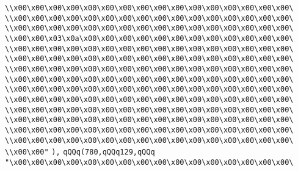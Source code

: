 \verb|\\x00\x00\x00\x00\x00\x00\x00\x00\x00\x00\x00\x00\x00\x00\x00\x00\|\newline
\verb|\\x00\x00\x00\x00\x00\x00\x00\x00\x00\x00\x00\x00\x00\x00\x00\x00\|\newline
\verb|\\x00\x00\x00\x00\x00\x00\x00\x00\x00\x00\x00\x00\x00\x00\x00\x00\|\newline
\verb|\\x00\x00\x03\x0a\x00\x00\x00\x00\x00\x00\x00\x00\x00\x00\x00\x00\|\newline
\verb|\\x00\x00\x00\x00\x00\x00\x00\x00\x00\x00\x00\x00\x00\x00\x00\x00\|\newline
\verb|\\x00\x00\x00\x00\x00\x00\x00\x00\x00\x00\x00\x00\x00\x00\x00\x00\|\newline
\verb|\\x00\x00\x00\x00\x00\x00\x00\x00\x00\x00\x00\x00\x00\x00\x00\x00\|\newline
\verb|\\x00\x00\x00\x00\x00\x00\x00\x00\x00\x00\x00\x00\x00\x00\x00\x00\|\newline
\verb|\\x00\x00\x00\x00\x00\x00\x00\x00\x00\x00\x00\x00\x00\x00\x00\x00\|\newline
\verb|\\x00\x00\x00\x00\x00\x00\x00\x00\x00\x00\x00\x00\x00\x00\x00\x00\|\newline
\verb|\\x00\x00\x00\x00\x00\x00\x00\x00\x00\x00\x00\x00\x00\x00\x00\x00\|\newline
\verb|\\x00\x00\x00\x00\x00\x00\x00\x00\x00\x00\x00\x00\x00\x00\x00\x00\|\newline
\verb|\\x00\x00\x00\x00\x00\x00\x00\x00\x00\x00\x00\x00\x00\x00\x00\x00\|\newline
\verb|\\x00\x00\x00\x00\x00\x00\x00\x00\x00\x00\x00\x00\x00\x00\x00\x00\|\newline
\verb|\\x00\x00"|\newline
\verb|),|\newline
\verb|qQQq(780,qQQq129,qQQq|\newline
\verb|"\x00\x00\x00\x00\x00\x00\x00\x00\x00\x00\x00\x00\x00\x00\x00\x00\|\newline
